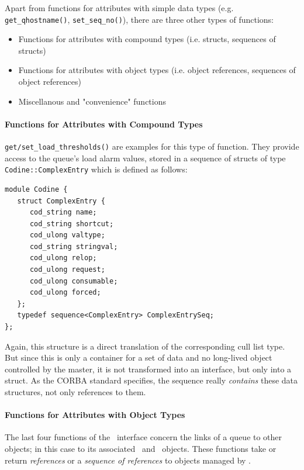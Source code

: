 Apart from functions for attributes with simple data types (e.g.
\texttt{get\-\_qhostname()}, \texttt{set\_seq\_no()}), there are three other
types of functions:

\begin{itemize}
\item Functions for attributes with compound types (i.e. structs, sequences of
structs)
\item Functions for attributes with object types (i.e. object references,
sequences of object references)
\item Miscellanous and "convenience" functions
\end{itemize}

\paragraph{Functions for Attributes with Compound Types\\}
\texttt{get/set\_load\_thresholds()} are examples for this
type of function. They provide access to the queue's load alarm values,
stored in a sequence of structs of type \texttt{Codine::ComplexEntry} which
is defined as follows:

\begin{Verbatim}[fontsize=\small, frame=single]
module Codine {
   struct ComplexEntry {
      cod_string name;
      cod_string shortcut;
      cod_ulong valtype;
      cod_string stringval;
      cod_ulong relop;
      cod_ulong request;
      cod_ulong consumable;
      cod_ulong forced;
   };
   typedef sequence<ComplexEntry> ComplexEntrySeq;
};
\end{Verbatim}

Again, this structure is a direct translation of the corresponding cull list
type. But since this is only a container for a set of data and no long-lived
object controlled by the master, it is not transformed into an interface, but
only into a struct. As the CORBA standard specifies, the sequence really
\emph{contains} these data structures, not only references to them.

\paragraph{Functions for Attributes with Object Types\\}
The last four functions of the \queue\ interface concern the links of a queue
to other objects; in this case to its associated \calendar\ and \complex\
objects. These functions take or return \emph{references} or a \emph{sequence
of references} to objects managed by \master.

